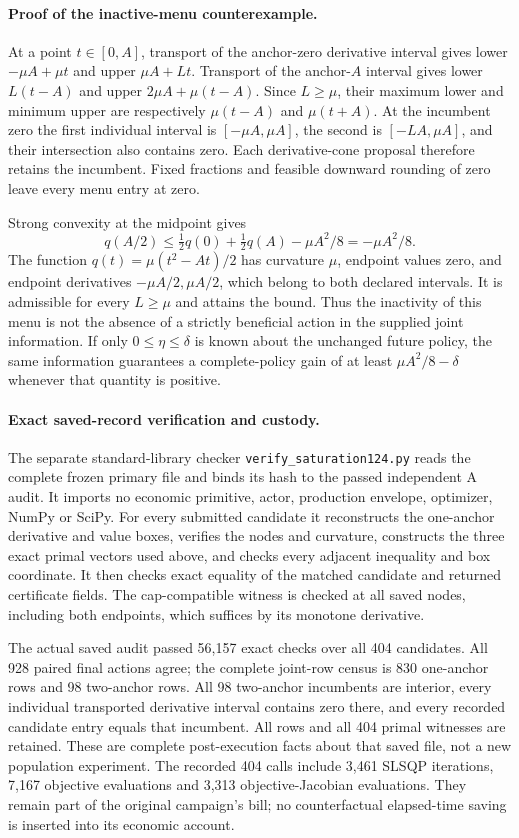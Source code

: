 \paragraph{Proof of the inactive-menu counterexample.}
At a point $t\in[0,A]$, transport of the anchor-zero derivative interval
gives lower $-\mu A+\mu t$ and upper $\mu A+Lt$.
Transport of the anchor-$A$ interval gives lower $L(t-A)$ and upper
$2\mu A+\mu(t-A)$. Since $L\ge\mu$, their maximum lower and minimum
upper are respectively $\mu(t-A)$ and $\mu(t+A)$.
At the incumbent zero the first individual interval is
$[-\mu A,\mu A]$, the second is $[-LA,\mu A]$, and their
intersection also contains zero. Each derivative-cone proposal
therefore retains the incumbent. Fixed fractions and feasible downward
rounding of zero leave every menu entry at zero.

Strong convexity at the midpoint gives
\[
 q(A/2)\le\tfrac12q(0)+\tfrac12q(A)-\mu A^2/8
                =-\mu A^2/8.
\]
The function $q(t)=\mu(t^2-At)/2$ has curvature $\mu$, endpoint
values zero, and endpoint derivatives $-\mu A/2,\mu A/2$, which
belong to both declared intervals. It is admissible for every
$L\ge\mu$ and attains the bound. Thus the inactivity of this menu
is not the absence of a strictly beneficial action in the supplied
joint information. If only $0\le\eta\le\delta$ is known about the
unchanged future policy, the same information guarantees a complete-policy
gain of at least $\mu A^2/8-\delta$ whenever that quantity is positive.

\paragraph{Exact saved-record verification and custody.}
The separate standard-library checker \texttt{verify\_saturation124.py}
reads the complete frozen primary file and binds its hash to the passed
independent A audit. It imports no economic primitive, actor, production
envelope, optimizer, NumPy or SciPy. For every submitted candidate it
reconstructs the one-anchor derivative and value boxes, verifies the
nodes and curvature, constructs the three exact primal vectors used
above, and checks every adjacent inequality and box coordinate.
It then checks exact equality of the matched candidate and returned
certificate fields. The cap-compatible witness is checked at all saved
nodes, including both endpoints, which suffices by its monotone derivative.

The actual saved audit passed 56,157 exact checks over all 404 candidates.
All 928 paired final actions agree; the complete joint-row census is
830 one-anchor rows and 98 two-anchor rows. All 98 two-anchor incumbents
are interior, every individual transported derivative interval contains
zero there, and every recorded candidate entry equals that incumbent.
All rows and all 404 primal witnesses are retained. These are complete
post-execution facts about that saved file, not a new population experiment.
The recorded 404 calls include 3,461 SLSQP iterations, 7,167 objective
evaluations and 3,313 objective-Jacobian evaluations. They remain part
of the original campaign's bill; no counterfactual elapsed-time saving
is inserted into its economic account.

